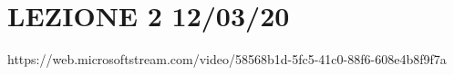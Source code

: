 \section{LEZIONE 2 12/03/20}
https://web.microsoftstream.com/video/58568b1d-5fc5-41c0-88f6-608e4b8f9f7a